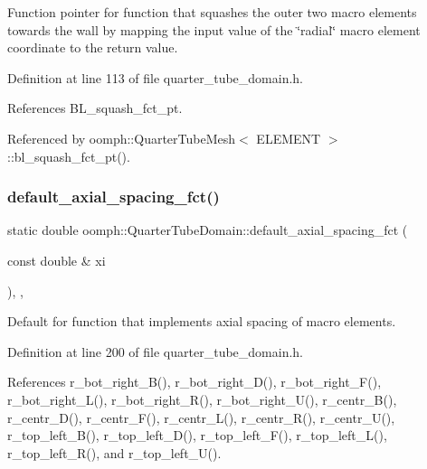 Function pointer for function that squashes the outer two macro elements towards the wall by mapping the input value of the \char`\"{}radial\char`\"{} macro element coordinate to the return value. 



Definition at line 113 of file quarter\+\_\+tube\+\_\+domain.\+h.



References B\+L\+\_\+squash\+\_\+fct\+\_\+pt.



Referenced by oomph\+::\+Quarter\+Tube\+Mesh$<$ E\+L\+E\+M\+E\+N\+T $>$\+::bl\+\_\+squash\+\_\+fct\+\_\+pt().

\mbox{\label{classoomph_1_1QuarterTubeDomain_ae568259fc1321c4bcbfae24e42e3b0f6}} 
\subsubsection{\texorpdfstring{default\+\_\+axial\+\_\+spacing\+\_\+fct()}{default\_axial\_spacing\_fct()}}
{\footnotesize\ttfamily static double oomph\+::\+Quarter\+Tube\+Domain\+::default\+\_\+axial\+\_\+spacing\+\_\+fct (\begin{DoxyParamCaption}\item[{const double \&}]{xi }\end{DoxyParamCaption})\hspace{0.3cm}{\ttfamily [inline]}, {\ttfamily [static]}, {\ttfamily [private]}}



Default for function that implements axial spacing of macro elements. 



Definition at line 200 of file quarter\+\_\+tube\+\_\+domain.\+h.



References r\+\_\+bot\+\_\+right\+\_\+\+B(), r\+\_\+bot\+\_\+right\+\_\+\+D(), r\+\_\+bot\+\_\+right\+\_\+\+F(), r\+\_\+bot\+\_\+right\+\_\+\+L(), r\+\_\+bot\+\_\+right\+\_\+\+R(), r\+\_\+bot\+\_\+right\+\_\+\+U(), r\+\_\+centr\+\_\+\+B(), r\+\_\+centr\+\_\+\+D(), r\+\_\+centr\+\_\+\+F(), r\+\_\+centr\+\_\+\+L(), r\+\_\+centr\+\_\+\+R(), r\+\_\+centr\+\_\+\+U(), r\+\_\+top\+\_\+left\+\_\+\+B(), r\+\_\+top\+\_\+left\+\_\+\+D(), r\+\_\+top\+\_\+left\+\_\+\+F(), r\+\_\+top\+\_\+left\+\_\+\+L(), r\+\_\+top\+\_\+left\+\_\+\+R(), and r\+\_\+top\+\_\+left\+\_\+\+U().


